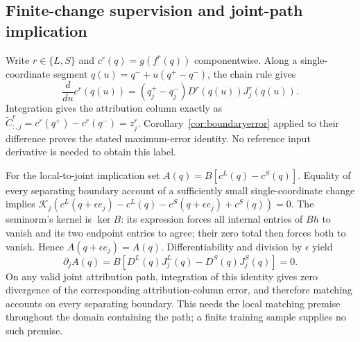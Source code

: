 \subsection{Finite-change supervision and joint-path implication}\label{app:pairproof}
\begin{pf}
Write $r\in\{L,S\}$ and $c^r(q)=g(f^r(q))$ componentwise. Along a
single-coordinate segment $q(u)=q^-+u(q^+-q^-)$, the chain rule gives
\[
\frac{d}{du}c^r(q(u))=(q_j^+-q_j^-)
D^r(q(u))J_j^r(q(u)).
\]
Integration gives the attribution column exactly as
$\widetilde C^r_{:,j}=c^r(q^+)-c^r(q^-)=z_j^r$.
Corollary~\ref{cor:boundaryerror} applied to their difference proves
the stated maximum-error identity. No reference input derivative is
needed to obtain this label.

For the local-to-joint implication set
$A(q)=B[c^L(q)-c^S(q)]$. Equality of every separating boundary account
of a sufficiently small single-coordinate change implies
$\mathcal K_j(c^L(q+\epsilon e_j)-c^L(q)
-c^S(q+\epsilon e_j)+c^S(q))=0$.
The seminorm's kernel is $\ker B$: its expression forces all internal
entries of $Bh$ to vanish and its two endpoint entries to agree; their
zero total then forces both to vanish. Hence
$A(q+\epsilon e_j)=A(q)$. Differentiability and division by $\epsilon$
yield
\[
\partial_j A(q)=B[D^L(q)J_j^L(q)-D^S(q)J_j^S(q)]=0.
\]
On any valid joint attribution path, integration of this identity gives
zero divergence of the corresponding attribution-column error, and
therefore matching accounts on every separating boundary. This needs
the local matching premise throughout the domain containing the path;
a finite training sample supplies no such premise.
\end{pf}

